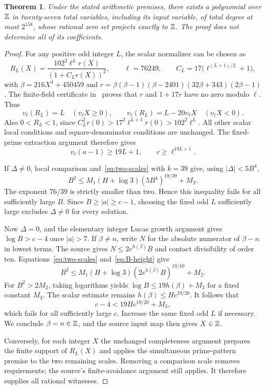 \documentclass[11pt,a4paper]{article}
\newtheorem{theorem}{Theorem}
\begin{document}
\begin{theorem}\label{thm:27}
Under the stated arithmetic premises, there exists a polynomial
over $\mathbb Z$ in twenty-seven total variables, including its input
variable, of total degree at most $2^{158}$, whose rational
zero set projects exactly to $\mathbb Z$.
The proof does not determine all of its coefficients.
\end{theorem}
\begin{proof}
For any positive odd integer $L$, the scalar normalizer can be
chosen as
\[
 R_L(X)=\frac{102^2\ell^L r(X)}{(1+C_Lr(X))^2},
 \qquad \ell=76249,\qquad
 C_L=17\bigl(\ell^{(L+1)/2}+1\bigr),
\]
with $\beta=216X^4+450459$ and
$r=\beta(\beta-1)(\beta-2401)(32\beta+343)(2\beta-1)$.
The finite-field certificate in~\cite{ScalarNormalization}
proves that $r$ and $1+17r$ have no
zero modulo $\ell$. Thus
\[
 v_\ell(R_L)=L\quad(v_\ell X\ge0),\qquad
 v_\ell(R_L)=L-20v_\ell X\quad(v_\ell X<0).
\]
Also $0<R_L<1$, since
$C_L^2r(0)>17^2\ell^{L+1}r(0)>102^2\ell^L$.
All other scalar local conditions and square-denominator
conditions are unchanged. The fixed-prime extraction argument
therefore gives
\[
 v_\ell(a-1)\ge19L+1,
 \qquad c\ge\ell^{19L+1}.
\]

If $\Delta\ne0$, local comparison and~\eqref{eq:two-scales}
with $k=39$ give, using $|\Delta|<5B^4$,
\[
 B^2\le M_1(H+\log3)(5B^4)^{19/39}+M_2.
\]
The exponent $76/39$ is strictly smaller than two. Hence this
inequality fails for all sufficiently large $B$. Since
$B\ge|a|\ge c-1$, choosing the fixed odd $L$ sufficiently
large excludes $\Delta\ne0$ for every solution.

Now $\Delta=0$, and the elementary integer Lucas growth
argument gives $\log B>c-4$ once $|a|>7$.
If $\beta\ne n$, write $N$ for the absolute numerator of
$\beta-n$ in lowest terms. The source gives
$N\le2e^{h(\beta)}B$ and contact divisibility of order ten.
Equations~\eqref{eq:two-scales} and~\eqref{eq:B-height} give
\[
 B^2\le M_1(H+\log3)
               (2e^{h(\beta)}B)^{19/10}+M_2.
\]
For $B^2>2M_2$, taking logarithms yields
$\log B\le19h(\beta)+M_3$ for a fixed constant $M_3$.
The scalar estimate remains $h(\beta)\le Hc^{19/20}$.
It follows that
\[
 c-4<19Hc^{19/20}+M_3,
\]
which fails for all sufficiently large $c$. Increase the
same fixed odd $L$ if necessary. We conclude $\beta=n\in\mathbb Z$,
and the source input map then gives $X\in\mathbb Z$.

Conversely, for each integer $X$ the unchanged completeness
argument prepares the finite support of $R_L(X)$ and applies
the simultaneous prime-pattern premise to the two remaining
scales. Removing a comparison scale removes requirements;
the source's finite-avoidance argument still applies. It
therefore supplies all rational witnesses.


\end{proof}
\end{document}
